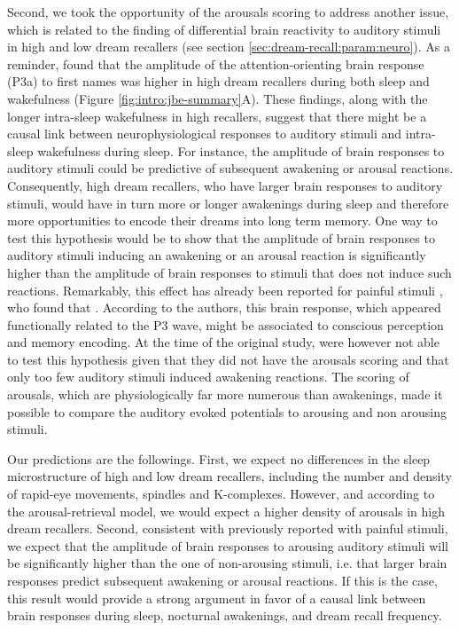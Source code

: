 Second, we took the opportunity of the arousals scoring to address another issue, which is related to the finding of differential brain reactivity to auditory stimuli in high and low dream recallers (see section \ref{sec:dream-recall:param:neuro}). As a reminder, \citet{eichenlaub_brain_2014} found that the amplitude of the attention-orienting brain response (P3a) to first names was higher in high dream recallers during both sleep and wakefulness (Figure \ref{fig:intro:jbe-summary}A). These findings, along with the longer intra-sleep wakefulness in high recallers, suggest that there might be a causal link between neurophysiological responses to auditory stimuli and intra-sleep wakefulness during sleep. For instance, the amplitude of brain responses to auditory stimuli could be predictive of subsequent awakening or arousal reactions. Consequently, high dream recallers, who have larger brain responses to auditory stimuli, would have in turn more or longer awakenings during sleep and therefore more opportunities to encode their dreams into long term memory. One way to test this hypothesis would be to show that the amplitude of brain responses to auditory stimuli inducing an awakening or an arousal reaction is significantly higher than the amplitude of brain responses to stimuli that does not induce such reactions. Remarkably, this effect has already been reported for painful stimuli \citet{bastuji_laser_2008}, who found that . According to the authors, this brain response, which appeared functionally related to the P3 wave, might be associated to conscious perception and memory encoding. At the time of the original study, \citet{eichenlaub_brain_2014} were however not able to test this hypothesis given that they did not have the arousals scoring and that only too few auditory stimuli induced awakening reactions. The scoring of arousals, which are physiologically far more numerous than awakenings, made it possible to compare the auditory evoked potentials to arousing and non arousing stimuli.

Our predictions are the followings. First, we expect no differences in the sleep microstructure of high and low dream recallers, including the number and density of rapid-eye movements, spindles and K-complexes. However, and according to the arousal-retrieval model, we would expect a higher density of arousals in high dream recallers. Second, consistent with previously reported with painful stimuli, we expect that the amplitude of brain responses to arousing auditory stimuli will be significantly higher than the one of non-arousing stimuli, i.e. that larger brain responses predict subsequent awakening or arousal reactions. If this is the case, this result would provide a strong argument in favor of a causal link between brain responses during sleep, nocturnal awakenings, and dream recall frequency.


